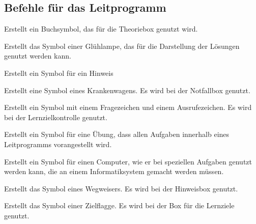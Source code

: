 \subsection{Befehle für das Leitprogramm} 
\begin{commands}
     Erstellt ein Buchsymbol, das für die Theoriebox genutzt wird. \buchBild

     Erstellt das Symbol einer Glühlampe, das für die Darstellung der Lösungen genutzt werden kann. \gluehlampeBild

     Erstellt ein Symbol für ein Hinweis \hinweisBild{}

     Erstellt eine Symbol eines Krankenwagens. Es wird bei der Notfallbox genutzt. \krankenwagenBild

     Erstellt ein Symbol mit einem Fragezeichen und einem Ausrufezeichen. Es wird bei der Lernzielkontrolle genutzt. \lernkontrolleBild

     Erstellt ein Symbol für eine Übung, dass allen Aufgaben innerhalb eines Leitprogramms vorangestellt wird.
    \uebungBild{}

     Erstellt ein Symbol für einen Computer, wie er bei speziellen Aufgaben genutzt werden kann, die an einem Informatiksystem gemacht werden müssen. \uebungPCBild

     Erstellt das Symbol eines Wegweisers. Es wird bei der Hinweisbox genutzt. \wegweiserBild{}

     Erstellt das Symbol einer Zielflagge. Es wird bei der Box für die Lernziele genutzt. \zielBild
\end{commands}
